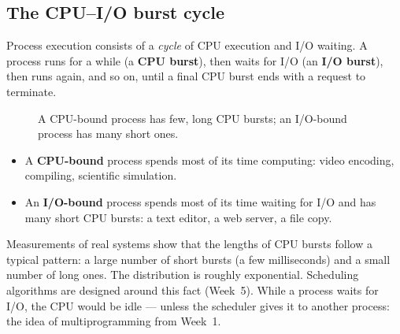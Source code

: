 \documentclass[11pt,a4paper]{article}
\newcommand{\term}[1]{\textbf{\color{mintdeep}#1}}
\begin{document}
\subsection{The CPU--I/O burst cycle}

Process execution consists of a \emph{cycle} of CPU execution and I/O waiting. A process runs for a while (a \term{CPU burst}), then waits for I/O (an \term{I/O burst}), then runs again, and so on, until a final CPU burst ends with a request to terminate.

\begin{figure}[H]
\centering
{}
\caption{A CPU-bound process has few, long CPU bursts; an I/O-bound process has many short ones.}
\end{figure}

\begin{itemize}
  \item A \term{CPU-bound} process spends most of its time computing: video encoding, compiling, scientific simulation.
  \item An \term{I/O-bound} process spends most of its time waiting for I/O and has many short CPU bursts: a text editor, a web server, a file copy.
\end{itemize}

Measurements of real systems show that the lengths of CPU bursts follow a typical pattern: a large number of short bursts (a few milliseconds) and a small number of long ones. The distribution is roughly exponential. Scheduling algorithms are designed around this fact (Week~5). While a process waits for I/O, the CPU would be idle --- unless the scheduler gives it to another process: the idea of multiprogramming from Week~1.
\end{document}
